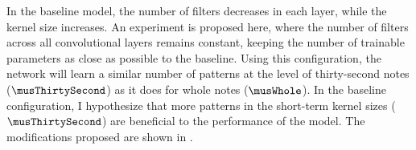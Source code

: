 
In the baseline model, the number of filters decreases in
each layer, while the kernel size increases. An experiment
is proposed here, where the number of filters across all
convolutional layers remains constant, keeping the number of
trainable parameters as close as possible to the baseline.
Using this configuration, the network will learn a similar
number of patterns at the level of thirty-second notes
($\musThirtySecond$) as it does for whole notes
($\musWhole$). In the baseline configuration, I hypothesize
that more patterns in the short-term kernel sizes
($\musThirtySecond$) are beneficial to the performance of
the model. The modifications proposed are shown in
.

